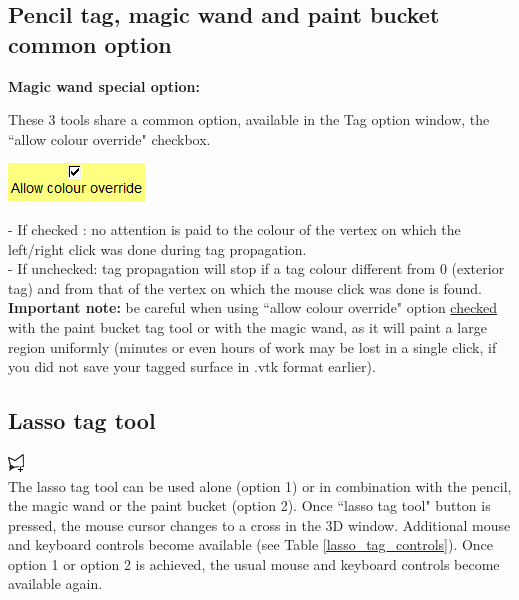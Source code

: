 \subsection{Pencil tag, magic wand and paint bucket common option}
\noindent
\textbf{Magic wand special option:}\\
\noindent
\begin{minipage}{0.6\textwidth}
These 3 tools share a common option, available in the Tag option
window, the ``allow colour override" checkbox.\end{minipage}    
\begin{minipage}{0.4\textwidth}\centering
  \includegraphics[scale=0.5]{images/Tags/Allow_colour_override.png}
 \end{minipage} 
\noindent
- If checked : no attention is paid to the colour of the vertex on
which the left/right click was done during tag propagation.\\
- If unchecked: tag propagation will stop if a tag colour different from 0 (exterior tag) and from that of the vertex on which the mouse click was done is found.\\
\textbf{Important note:} be careful when using ``allow colour override" option \underline{checked} with the paint bucket tag tool or with the magic wand, as it will paint a large region uniformly (minutes or even hours of work may be lost in a single click, if you did not save your tagged surface in .vtk format earlier).

\subsection{Lasso tag tool}
\includegraphics[scale=0.7]{images/pixmap/Lasso_plus.png}\\
The lasso tag tool can be used alone (option 1) or in combination with the pencil, the magic wand or the paint bucket (option 2). Once ``lasso tag tool" button is pressed, the mouse cursor changes to a cross in the 3D window. Additional mouse and keyboard controls become available (see Table \ref{lasso_tag_controls}). Once option 1 or option 2 is achieved, the usual mouse and keyboard controls become available
again.


